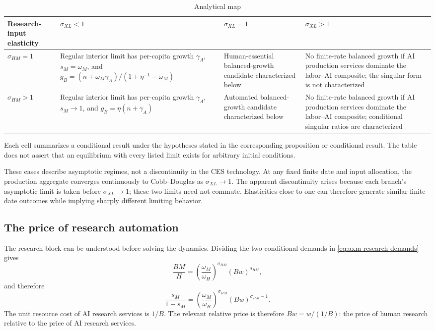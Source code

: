 \begin{table}[H]
\centering
\small
\setlength{\tabcolsep}{4pt}
\caption{Analytical map}
\label{tab:axm-regime-map}
\begin{tabular}{P{0.14\textwidth}P{0.235\textwidth}P{0.235\textwidth}P{0.235\textwidth}}
\toprule
Research-input elasticity & \(\sigma_{XL}<1\) & \(\sigma_{XL}=1\) & \(\sigma_{XL}>1\)\\
\midrule
\(\sigma_{HM}=1\) &
Regular interior limit has per-capita growth \(\gamma_A\),
\(s_M=\omega_M\), and
\(g_B=(n+\omega_M\gamma_A)/(1+\eta^{-1}-\omega_M)\) &
Human-essential balanced-growth candidate characterized below &
 No finite-rate balanced growth if AI production services dominate the labor--AI composite; the singular form is not characterized\\
\(\sigma_{HM}>1\) &
 Regular interior limit has per-capita growth \(\gamma_A\),
 \(s_M\to1\), and \(g_B=\eta(n+\gamma_A)\) &
 Automated balanced-growth candidate characterized below &
 No finite-rate balanced growth if AI production services dominate the labor--AI composite; conditional singular ratios are characterized\\
\bottomrule
\end{tabular}
\end{table}

Each cell summarizes a conditional result under the hypotheses stated in the
corresponding proposition or conditional result. The table does not assert that
an equilibrium with every listed limit exists for arbitrary initial conditions.

These cases describe asymptotic regimes, not a discontinuity in the CES
technology. At any fixed finite date and input allocation, the production
aggregate converges continuously to Cobb--Douglas as
\(\sigma_{XL}\to1\). The apparent discontinuity arises because each branch's
asymptotic limit is taken before \(\sigma_{XL}\to1\); these two limits need not
commute. Elasticities close to one can therefore generate similar finite-date
outcomes while implying sharply different limiting behavior.

\subsection{The price of research automation}

The research block can be understood before solving the dynamics. Dividing the
two conditional demands in \eqref{eq:axm-research-demands} gives
\begin{equation}
 \frac{BM}{H}
 =\left(\frac{\omega_M}{\omega_H}\right)^{\sigma_{HM}}
  (Bw)^{\sigma_{HM}},
 \label{eq:axm-input-ratio}
\end{equation}
and therefore
\begin{equation}
 \frac{s_M}{1-s_M}
 =\left(\frac{\omega_M}{\omega_H}\right)^{\sigma_{HM}}
  (Bw)^{\sigma_{HM}-1}.
 \label{eq:axm-automation-odds}
\end{equation}
The unit resource cost of AI research services is \(1/B\). The relevant
relative price is therefore \(Bw=w/(1/B)\): the price of human research relative
to the price of AI research services.

